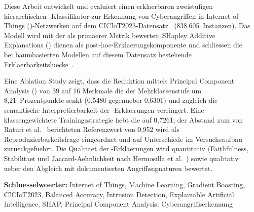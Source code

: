 Diese Arbeit entwickelt und evaluiert einen erklaerbaren zweistufigen hierarchischen
\gb{}-Klassifikator zur Erkennung von Cyberangriffen in Internet of Things (\iot{})-Netzwerken
auf dem CICIoT2023-Datensatz~\cite{neto2023ciciot2023} (838.605~Instanzen).
Das Modell wird mit der \ba{} als primaerer Metrik bewertet; SHapley Additive Explanations
(\shap{}) dienen als post-hoc-Erklaerungskomponente und schliessen die bei baumbasierten
Modellen auf diesem Datensatz bestehende Erklaerbarkeitsluecke~\cite{raturi2026exploratory}.

Eine Ablation Study zeigt, dass die Reduktion mittels Principal Component Analysis (\pca{})
von 39 auf 16 Merkmale die \ba{} der Mehrklassenstufe um 8{,}21~Prozentpunkte senkt (0{,}5480
gegenueber 0{,}6301) und zugleich die semantische Interpretierbarkeit der
\shap{}-Erklaerungen verringert.
Eine klassengewichtete Trainingsstrategie hebt die \ba{} auf 0{,}7261; der Abstand zum von
Raturi et al.\ \cite{raturi2026exploratory} berichteten Referenzwert von 0{,}952 wird als
Reproduzierbarkeitsfrage eingeordnet und auf Unterschiede im Versuchsaufbau zurueckgefuehrt.
Die Qualitaet der \shap{}-Erklaerungen wird quantitativ (Faithfulness, Stabilitaet und
Jaccard-Aehnlichkeit nach Hermosilla et al.~\cite{hermosilla2025xai_forensic}) sowie qualitativ
ueber den Abgleich mit dokumentierten Angriffssignaturen bewertet.

\textbf{Schluesselwoerter:}
Internet of Things, Machine Learning, Gradient Boosting, CICIoT2023, Balanced Accuracy,
Intrusion Detection, Explainable Artificial Intelligence, SHAP, Principal Component
Analysis, Cyberangriffserkennung
